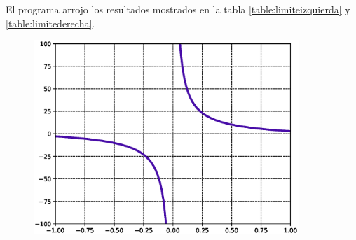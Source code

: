 El programa arrojo los resultados mostrados en la tabla \ref{table:limiteizquierda} y \ref{table:limitederecha}.
\begin{figure}[H]
    \centering
    \includegraphics[width=10cm]{Graphics/limit.eps}
    \caption{}
    \label{fig:fx2}
\end{figure}
